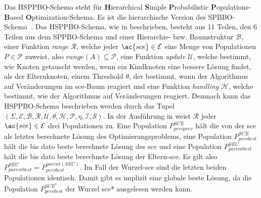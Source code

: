 \documentclass[fontsize=12, a4aper]{scrartcl}
\begin{document}
	Das HSPPBO-Schema steht für \textbf{H}ierarchical \textbf{S}imple \textbf{P}robabilistic \textbf{P}opulations-\textbf{B}ased \textbf{O}ptimization-Schema. Es ist die hierarchische Version des SPBBO-Schema~\cite{lin2015simple}. Das HSPPBO-Schema, wie in \cite{kupfer2021hierarchical} beschrieben, besteht aus 11 Teilen, den 6 Teilen aus dem SPPBO-Schema und einer Hierarchie- bzw. Baumstruktur \(\mathcal{B}\), einer Funktion \textit{range} \(\mathcal{R}\), welche jeder \(\ac{sce} \in \mathcal{E}\) eine Menge von Populationen \(P \in \mathcal{P}\) zuweist, also \(range(A) \subseteq \mathcal{P}\), eine Funktion \textit{update} \(\mathcal{U}\), welche bestimmt, wie Knoten getauscht werden, wenn ein Kindknoten eine bessere Lösung findet, als der Elternknoten, einem Threshold \(\theta\), der bestimmt, wann der Algorithmus auf Veränderungen im \ac{sce}-Baum reagiert und eine Funktion \textit{handling} \(\mathcal{H}\), welche bestimmt, wie der Algorithmus auf Veränderungen reagiert. Demnach kann das HSPPBO-Schema beschrieben werden durch das Tupel \((\Sigma, \mathcal{E}, \mathcal{B}, \mathcal{R}, \mathcal{U}, \theta, \mathcal{H}, \mathcal{P}, \eta, \mathcal{I}, \mathcal{S})\). In der Ausführung in \cite{kupfer2021hierarchical} weist \(\mathcal{R}\) jeder \(\ac{sce} \in \mathcal{E}\) drei Populationen zu. Eine Population \(P^{SCE}_{persprev}\) hält die von der \ac{sce} als letztes berechnete Lösung des Optimierungsproblems, eine Population \(P^{SCE}_{persbest}\) hält die bis dato beste berechnete Lösung des \ac{sce} und eine Population \(P^{SEC}_{parentbest}\) hält die bis dato beste berechnete Lösung der Eltern-\ac{sce}. Es gilt also \(P^{SEC}_{parentbest} = P^{parent(SEC)}_{persbest}\). Im Fall der Wurzel-\ac{sce} sind die letzten beiden Populationen identisch. Damit gibt es implizit eine globale beste Lösung, da die Population \(P^{SCE^*}_{persbest}\) der Wurzel \ac{sce}* ausgelesen werden kann.\hfill\newline
	
\end{document}
